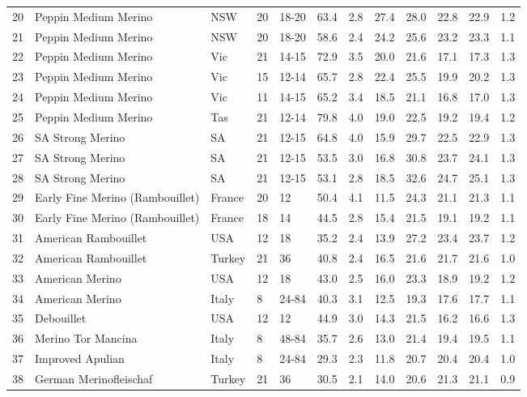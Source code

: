 \begin{center}
\begin{landscape}
\begin{longtable}{|p{0.4in}|p{0.9in}|p{0.7in}|p{0.5in}|p{0.5in}|p{0.5in}|p{0.5in}|p{0.5in}|p{0.5in}|p{0.5in}|p{0.5in}|p{0.5in}|}
 20 &  Peppin Medium Merino &  NSW & 20 &  18-20 & 63.4 & 2.8 & 27.4 & 28.0 & 22.8 & 22.9 & 1.2 \\ 
 21 &  Peppin Medium Merino &  NSW & 20 &  18-20 & 58.6 & 2.4 & 24.2 & 25.6 & 23.2 & 23.3 & 1.1 \\ 
 22 &  Peppin Medium Merino &  Vic & 21 &  14-15 & 72.9 & 3.5 & 20.0 & 21.6 & 17.1 & 17.3 & 1.3 \\ 
 23 &  Peppin Medium Merino &  Vic & 15 &  12-14 & 65.7 & 2.8 & 22.4 & 25.5 & 19.9 & 20.2 & 1.3 \\ 
 24 &  Peppin Medium Merino &  Vic & 11 &  14-15 & 65.2 & 3.4 & 18.5 & 21.1 & 16.8 & 17.0 & 1.3 \\ 
 25 &  Peppin Medium Merino &  Tas & 21 &  12-14 & 79.8 & 4.0 & 19.0 & 22.5 & 19.2 & 19.4 & 1.2 \\ 
 26 &  SA Strong Merino &  SA & 21 &  12-15 & 64.8 & 4.0 & 15.9 & 29.7 & 22.5 & 22.9 & 1.3 \\ 
 27 &  SA Strong Merino &  SA & 21 &  12-15 & 53.5 & 3.0 & 16.8 & 30.8 & 23.7 & 24.1 & 1.3 \\ 
 28 &  SA Strong Merino &  SA & 21 &  12-15 & 53.1 & 2.8 & 18.5 & 32.6 & 24.7 & 25.1 & 1.3 \\ 
 29 &  Early Fine Merino (Rambouillet) &  France & 20 &  12 & 50.4 & 4.1 & 11.5 & 24.3 & 21.1 & 21.3 & 1.1 \\ 
 30 &  Early Fine Merino (Rambouillet) &  France & 18 &  14 & 44.5 & 2.8 & 15.4 & 21.5 & 19.1 & 19.2 & 1.1 \\ 
 31 &  American Rambouillet &  USA & 12 &  18 & 35.2 & 2.4 & 13.9 & 27.2 & 23.4 & 23.7 & 1.2 \\ 
 32 &  American Rambouillet &  Turkey & 21 &  36 & 40.8 & 2.4 & 16.5 & 21.6 & 21.7 & 21.6 & 1.0 \\ 
 33 &  American Merino &  USA & 12 &  18 & 43.0 & 2.5 & 16.0 & 23.3 & 18.9 & 19.2 & 1.2 \\ 
 34 &  American Merino &  Italy &  8 &  24-84 & 40.3 & 3.1 & 12.5 & 19.3 & 17.6 & 17.7 & 1.1 \\ 
 35 &  Debouillet &  USA & 12 &  12 & 44.9 & 3.0 & 14.3 & 21.5 & 16.2 & 16.6 & 1.3 \\ 
 36 &  Merino Tor Mancina &  Italy &  8 &  48-84 & 35.7 & 2.6 & 13.0 & 21.4 & 19.4 & 19.5 & 1.1 \\ 
 37 &  Improved Apulian &  Italy &  8 &  24-84 & 29.3 & 2.3 & 11.8 & 20.7 & 20.4 & 20.4 & 1.0 \\ 
 38 &  German Merinofleischaf &  Turkey & 21 &  36 & 30.5 & 2.1 & 14.0 & 20.6 & 21.3 & 21.1 & 0.9 \\ 

\end{longtable}
\end{landscape}
\end{center}
